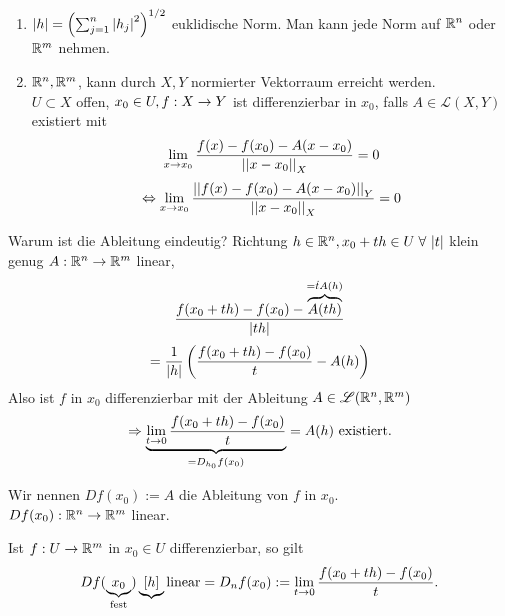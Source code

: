 \documentclass[../ana2.tex]{subfiles}
\begin{document}
\begin{bem}
    \begin{enumerate}
        \item \( \left|h\right| = \left( \sum_{j=1}^n \left|h_j\right|^2 \right)^{1/2} \) 
        euklidische Norm. Man kann jede Norm auf \( \mathbb{R}^n \) oder 
        \( \mathbb{R}^m \) nehmen.
        \item \( \mathbb{R}^n, \mathbb{R}^m \), kann durch \(X, Y\) 
        normierter Vektorraum erreicht werden. \\
        \( U \subset X \) offen, \( x_0 \in U, f:X\rightarrow Y \) ist
        differenzierbar in \(x_0\), falls \(A \in \mathscr{L}(X, Y) \)
        existiert mit
        \[ \lim\limits_{x\rightarrow{}x_0} \frac{f(x)-f(x_0)-A(x-x_0)}{\left|\left|x-x_0\right|\right|_X} = 0 \]
        \[ \Leftrightarrow \lim\limits_{x\rightarrow{}x_0} 
        \frac{\left|\left|f(x)-f(x_0)-A(x-x_0)\right|\right|_Y}{\left|\left|x-x_0\right|\right|_X} = 0 \]
    \end{enumerate}
    Warum ist die Ableitung eindeutig? 
    Richtung \( h \in \R^n, x_0 + th \in U 
    \;\forall \abs{t} \) klein genug
    \( A:\mathbb{R}^n\rightarrow \mathbb{R}^m \) linear, 
    \[ \frac{ f(x_0 + th) - f(x_0) - 
    \overbrace{A(th)}^{=\dot{t} A(h)} }{ \left|th\right| }\]
    \[ = \frac{1}{\left|h\right|} 
    \left( \frac{f(x_0 + th) - f(x_0)}{t} - A(h) \right) \]
    Also ist \( f \) in \( x_0 \) differenzierbar 
    mit der Ableitung \( A \in \mathscr{L}(\mathbb{R}^n, \mathbb{R}^m) \)    
    \[ \Rightarrow \underbrace{\lim\limits_{t\rightarrow{}0} \frac{f(x_0+th) 
    - f(x_0)}{t}}_{= D_{h_0}f(x_0)} = A(h) 
    \text{ existiert.} \]
\end{bem}
\begin{notation}
    Wir nennen \( D f(x_0) := A \) die 
    Ableitung von \(f\) in \(x_0\).\\
    \( Df(x_0):\mathbb{R}^n\rightarrow \mathbb{R}^m \) linear.
\end{notation}
\begin{satz}
    Ist \( f:U\rightarrow \mathbb{R}^m \) in \( x_0 \in U \)
    differenzierbar, so gilt 
    \[ Df(\underbrace{x_0}_{\text{fest}})\underbrace{[h]}{\text{linear}} 
    = D_n f(x_0) 
    := \lim\limits_{t\rightarrow{}0} \frac{f(x_0 + th) - f(x_0)}{t}. \]
\end{satz}
\end{document}
